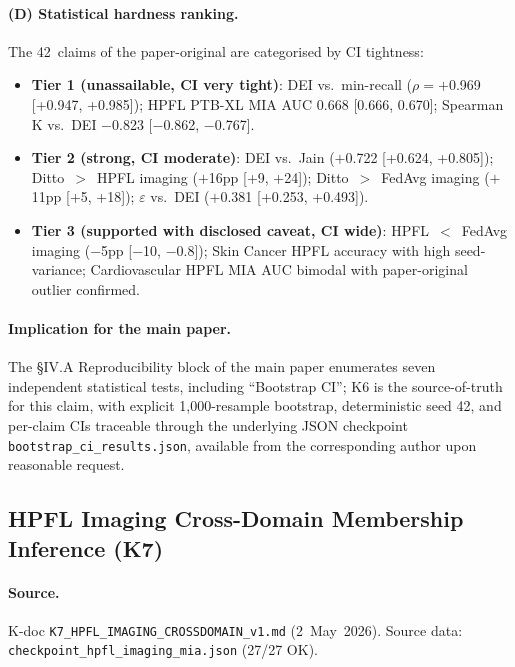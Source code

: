 \documentclass[conference]{IEEEtran}
\begin{document}
\paragraph{(D) Statistical hardness ranking.} The 42~claims of the paper-original are categorised by CI tightness:

\begin{itemize}
\item \textbf{Tier 1 (unassailable, CI very tight)}: DEI vs.\ min-recall ($\rho{=}+$0.969 [+0.947, +0.985]); HPFL PTB-XL MIA AUC 0.668 [0.666, 0.670]; Spearman K vs.\ DEI $-$0.823 [$-$0.862, $-$0.767].
\item \textbf{Tier 2 (strong, CI moderate)}: DEI vs.\ Jain ($+$0.722 [+0.624, +0.805]); Ditto~$>$~HPFL imaging ($+$16pp [+9, +24]); Ditto~$>$~FedAvg imaging ($+$11pp [+5, +18]); $\varepsilon$ vs.\ DEI ($+$0.381 [+0.253, +0.493]).
\item \textbf{Tier 3 (supported with disclosed caveat, CI wide)}: HPFL~$<$~FedAvg imaging ($-$5pp [$-$10, $-$0.8]); Skin Cancer HPFL accuracy with high seed-variance; Cardiovascular HPFL MIA AUC bimodal with paper-original outlier confirmed.
\end{itemize}

\paragraph{Implication for the main paper.} The §IV.A Reproducibility block of the main paper enumerates seven independent statistical tests, including ``Bootstrap CI''; K6 is the source-of-truth for this claim, with explicit 1{,}000-resample bootstrap, deterministic seed 42, and per-claim CIs traceable through the underlying JSON checkpoint \texttt{bootstrap\_ci\_results.json}, available from the corresponding author upon reasonable request.

\subsection{HPFL Imaging Cross-Domain Membership Inference (K7)}
\label{sec:s-prerebuttal-7}

\paragraph{Source.} K-doc \texttt{K7\_HPFL\_IMAGING\_\linebreak[1]CROSSDOMAIN\_v1.md} (2~May~2026). Source data: \texttt{checkpoint\_hpfl\_\linebreak[1]imaging\_mia.json} (27/27 OK).
\end{document}
